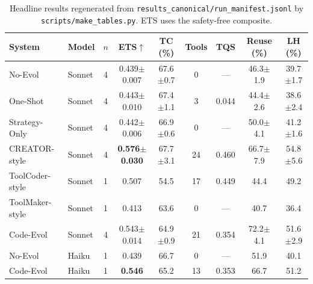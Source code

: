 \begin{table}[t]
\centering\small
\begin{tabular}{llccccccc}
\toprule
\textbf{System} & \textbf{Model} & $n$ & \textbf{ETS}$\uparrow$ & \textbf{TC (\%)} & \textbf{Tools} & \textbf{TQS} & \textbf{Reuse (\%)} & \textbf{LH (\%)} \\
\midrule
No-Evol & Sonnet & 4 & 0.439$\pm$0.007 & 67.6$\pm$0.7 & 0 & --- & 46.3$\pm$1.9 & 39.7$\pm$1.7 \\
One-Shot & Sonnet & 4 & 0.443$\pm$0.010 & 67.4$\pm$1.1 & 3 & 0.044 & 44.4$\pm$2.6 & 38.6$\pm$2.4 \\
Strategy-Only & Sonnet & 4 & 0.442$\pm$0.006 & 66.9$\pm$0.6 & 0 & --- & 50.0$\pm$4.1 & 41.2$\pm$1.6 \\
CREATOR-style & Sonnet & 4 & \textbf{0.576$\pm$0.030} & 67.7$\pm$3.1 & 24 & 0.460 & 66.7$\pm$7.9 & 54.8$\pm$5.6 \\
ToolCoder-style & Sonnet & 1 & 0.507 & 54.5 & 17 & 0.449 & 44.4 & 49.2 \\
ToolMaker-style & Sonnet & 1 & 0.413 & 63.6 & 0 & --- & 40.7 & 36.4 \\
Code-Evol & Sonnet & 4 & 0.543$\pm$0.014 & 64.9$\pm$0.9 & 21 & 0.354 & 72.2$\pm$4.1 & 51.6$\pm$2.9 \\
\midrule
No-Evol & Haiku & 1 & 0.439 & 66.7 & 0 & --- & 51.9 & 40.1 \\
Code-Evol & Haiku & 1 & \textbf{0.546} & 65.2 & 13 & 0.353 & 66.7 & 51.2 \\
\bottomrule
\end{tabular}
\caption{Headline results regenerated from \texttt{results\_canonical/run\_manifest.jsonl} by \texttt{scripts/make\_tables.py}. ETS uses the safety-free composite.}
\label{tab:results_auto}
\end{table}